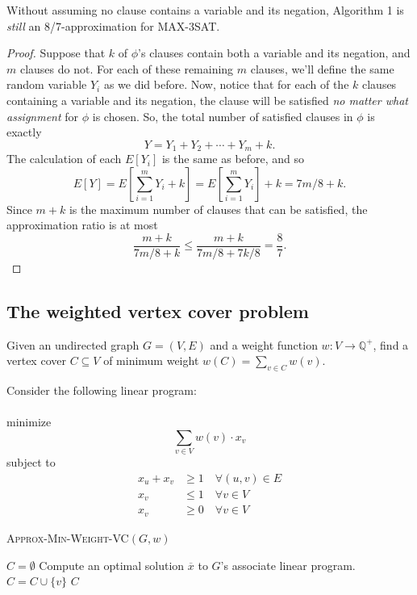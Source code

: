 \documentclass{article}
\newcommand{\Q}{\mathbb{Q}}
\newenvironment{proposition}[2][Proposition]{\begin{trivlist}
\item[\hskip \labelsep {\bfseries #1}\hskip \labelsep {\hspace{-1ex}\bfseries #2.}]}{\end{trivlist}}
\newenvironment{envsection}[1]{\begin{trivlist}
\item[\hskip \labelsep {\bfseries #1}]}{\end{trivlist}}
\begin{document}
\begin{proposition}{ 2.2}{}
    Without assuming no clause contains a variable and its negation, Algorithm 1 is \textit{still} an 8/7-approximation for MAX-3SAT.
\end{proposition}

\begin{proof}
    Suppose that $k$ of $\phi$'s clauses contain both a variable and its negation, and $m$ clauses do not. For each of these remaining $m$ clauses, we'll define the same random variable $Y_i$ as we did before. Now, notice that for each of the $k$ clauses containing a variable and its negation, the clause will be satisfied \textit{no matter what assignment} for $\phi$ is chosen. So, the total number of satisfied clauses in $\phi$ is exactly
    \[
    Y = Y_1 + Y_2 + \cdots + Y_m + k.
    \]
    The calculation of each $E[Y_i]$ is the same as before, and so
    \[
    E[Y] = E \left[ \sum_{i=1}^{m} Y_i + k \right] = E \left[ \sum_{i=1}^{m} Y_i \right] + k = 7m/8 + k.
    \]
    Since $m + k$ is the maximum number of clauses that can be satisfied, the approximation ratio is at most
    \[
    \frac{m+k}{7m/8 + k} \leq \frac{m+k}{7m/8 + 7k/8} = \frac{8}{7}.
    \]
\end{proof}

\subsection{The weighted vertex cover problem}

\begin{envsection}{Optimization Problem (Minimum Weight Vertex Cover)}
    Given an undirected graph $G = (V,E)$ and a weight function $w: V \to \Q^+$, find a vertex cover $C \subseteq V$ of minimum weight $w(C) = \sum_{v \in C} w(v)$.
\end{envsection}

Consider the following linear program:\\
\\
minimize 
$$\displaystyle \sum_{v \in V}w(v) \cdot x_v$$
subject to
\begin{align*}
    x_u + x_v &\geq 1 \quad \forall (u,v) \in E\\
    x_v &\leq 1 \quad \forall v \in V\\
    x_v &\geq 0 \quad \forall v \in V
\end{align*}

\begin{algorithm}
    \caption{\textsc{Approx-Min-Weight-VC}$(G, w)$}
    \begin{algorithmic}
        \State $C = \emptyset$
        \State Compute an optimal solution $\overline{x}$ to $G$'s associate linear program.
                \State $C = C \cup \{v\}$
            \EndIf
        \EndFor
        \State \Return $C$
    \end{algorithmic}
\end{algorithm}
\end{document}
